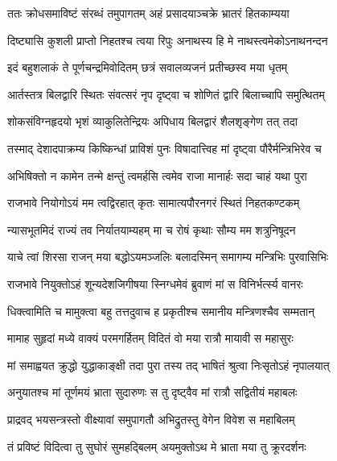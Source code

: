 
\twolineshloka
{ततः क्रोधसमाविष्टं संरब्धं तमुपागतम्}
{अहं प्रसादयाञ्चक्रे भ्रातरं हितकाम्यया} %

\twolineshloka
{दिष्ट्यासि कुशली प्राप्तो निहतश्च त्वया रिपुः}
{अनाथस्य हि मे नाथस्त्वमेकोऽनाथनन्दन} %

\twolineshloka
{इदं बहुशलाकं ते पूर्णचन्द्रमिवोदितम्}
{छत्रं सवालव्यजनं प्रतीच्छस्व मया धृतम्} %

\twolineshloka
{आर्तस्तत्र बिलद्वारि स्थितः संवत्सरं नृप}
{दृष्ट्वा च शोणितं द्वारि बिलाच्चापि समुत्थितम्} %

\twolineshloka
{शोकसंविग्नहृदयो भृशं व्याकुलितेन्द्रियः}
{अपिधाय बिलद्वारं शैलशृङ्गेण तत् तदा} %

\twolineshloka
{तस्माद् देशादपाक्रम्य किष्किन्धां प्राविशं पुनः}
{विषादात्त्विह मां दृष्ट्वा पौरैर्मन्त्रिभिरेव च} %

\twolineshloka
{अभिषिक्तो न कामेन तन्मे क्षन्तुं त्वमर्हसि}
{त्वमेव राजा मानार्हः सदा चाहं यथा पुरा} %

\twolineshloka
{राजभावे नियोगोऽयं मम त्वद्विरहात् कृतः}
{सामात्यपौरनगरं स्थितं निहतकण्टकम्} %

\twolineshloka
{न्यासभूतमिदं राज्यं तव निर्यातयाम्यहम्}
{मा च रोषं कृथाः सौम्य मम शत्रुनिषूदन} %

\twolineshloka
{याचे त्वां शिरसा राजन् मया बद्धोऽयमञ्जलिः}
{बलादस्मिन् समागम्य मन्त्रिभिः पुरवासिभिः} %

\twolineshloka
{राजभावे नियुक्तोऽहं शून्यदेशजिगीषया}
{स्निग्धमेवं ब्रुवाणं मां स विनिर्भर्त्स्य वानरः} %

\twolineshloka
{धिक्त्वामिति च मामुक्त्वा बहु तत्तदुवाच ह}
{प्रकृतीश्च समानीय मन्त्रिणश्चैव सम्मतान्} %

\twolineshloka
{मामाह सुहृदां मध्ये वाक्यं परमगर्हितम्}
{विदितं वो मया रात्रौ मायावी स महासुरः} %

\twolineshloka
{मां समाह्वयत क्रुद्धो युद्धाकाङ्क्षी तदा पुरा}
{तस्य तद् भाषितं श्रुत्वा निःसृतोऽहं नृपालयात्} %

\twolineshloka
{अनुयातश्च मां तूर्णमयं भ्राता सुदारुणः}
{स तु दृष्ट्वैव मां रात्रौ सद्वितीयं महाबलः} %

\twolineshloka
{प्राद्रवद् भयसन्त्रस्तो वीक्ष्यावां समुपागतौ}
{अभिद्रुतस्तु वेगेन विवेश स महाबिलम्} %

\twolineshloka
{तं प्रविष्टं विदित्वा तु सुघोरं सुमहद्बिलम्}
{अयमुक्तोऽथ मे भ्राता मया तु क्रूरदर्शनः} %

